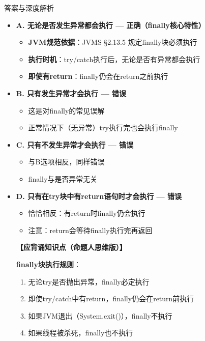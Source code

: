 \documentclass[12pt, a4paper]{ctexart}
\begin{document}
\begin{enumerate}[label=\textbf{\arabic*.}]
\begin{bluebox}{答案与深度解析}
\begin{itemize}[label={}, leftmargin=*, nosep]
		      \textbf{【选项原理深度拆解】}

		      \item \textbf{A. 无论是否发生异常都会执行 — 正确（finally核心特性）}
		      \begin{itemize}[label={}, leftmargin=*, nosep]
			      \item \textbf{JVM规范依据}：JVMS §2.13.5 规定finally块必须执行
			      \item \textbf{执行时机}：try/catch执行后，无论是否有异常都会执行
			      \item \textbf{即使有return}：finally仍会在return之前执行
		      \end{itemize}

		      \item \textbf{B. 只有发生异常才会执行 — 错误}
		      \begin{itemize}[label={}, leftmargin=*, nosep]
			      \item 这是对finally的常见误解
			      \item 正常情况下（无异常）try执行完也会执行finally
		      \end{itemize}

		      \item \textbf{C. 只有不发生异常才会执行 — 错误}
		      \begin{itemize}[label={}, leftmargin=*, nosep]
			      \item 与B选项相反，同样错误
			      \item finally与是否异常无关
		      \end{itemize}

		      \item \textbf{D. 只有在try块中有return语句时才会执行 — 错误}
		      \begin{itemize}[label={}, leftmargin=*, nosep]
			      \item 恰恰相反：有return时finally仍会执行
			      \item 注意：return会等待finally执行完再返回
		      \end{itemize}

		      \textbf{【应背诵知识点（命题人思维版）】}

		      \textbf{finally块执行规则}：
		      \begin{enumerate}[label={}, leftmargin=*, nosep]
			      \item 无论try是否抛出异常，finally必定执行
			      \item 即使try/catch中有return，finally仍会在return前执行
			      \item 如果JVM退出（System.exit()），finally不执行
			      \item 如果线程被杀死，finally也不执行
		      \end{enumerate}


\end{itemize}
\end{bluebox}
\end{enumerate}
\end{document}
